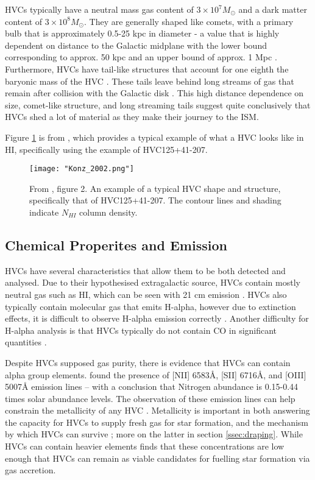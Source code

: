 HVCs typically have a neutral mass gas content of $3\times10^7 M_{\odot}$ and a dark matter content of $3\times10^8 M_{\odot}$. They are generally shaped like comets, with a primary bulb that is approximately 0.5-25 kpc in diameter - a value that is highly dependent on distance to the Galactic midplane with the lower bound corresponding to approx. 50 kpc and an upper bound of approx. 1 Mpc \citep{ID66, ID13}. Furthermore, HVCs have tail-like structures that account for one eighth the baryonic mass of the HVC \citep{ID13}. These tails leave behind long streams of gas that remain after collision with the Galactic disk \citep{ID19}. This high distance dependence on size, comet-like structure, and long streaming tails suggest quite conclusively that HVCs shed a lot of material as they make their journey to the ISM.


Figure \ref{fig:hvc_example} is from \citep{ID13}, which provides a typical example of what a HVC looks like in HI, specifically using the example of HVC125+41-207.

\begin{figure}
    \texttt{[image: "Konz\_2002.png"]}
    \centering
    \caption{From \citep{ID13}, figure 2. An example of a typical HVC shape and structure, specifically that of HVC125+41-207. The contour lines and shading indicate $N_{HI}$ column density.}
    \label{fig:hvc_example}
\end{figure}

\subsection{Chemical Properites and Emission}
\label{ssec:chem}

HVCs have several characteristics that allow them to be both detected and analysed. Due to their hypothesised extragalactic source, HVCs contain mostly neutral gas such as HI, which can be seen with 21 cm emission \citep{ID7, ID8, ID6}. HVCs also typically contain molecular gas that emits H-alpha, however due to extinction effects, it is difficult to observe H-alpha emission correctly \citep{ID9, ID43}. Another difficulty for H-alpha analysis is that HVCs typically do not contain CO in significant quantities \citep{ID66}.


Despite HVCs supposed gas purity, there is evidence that HVCs can contain alpha group elements. \cite{ID49, ID48} found the presence of [NII] 6583{\AA}, [SII] 6716{\AA}, and [OIII] 5007{\AA} emission lines – with a conclusion that Nitrogen abundance is 0.15-0.44 times solar abundance levels. The observation of these emission lines can help constrain the metallicity of any HVC  \citep{ID49}. Metallicity is important in both answering the capacity for HVCs to supply fresh gas for star formation, and the mechanism by which HVCs can survive \citep{ID24}; more on the latter in section \ref{ssec:draping}. While HVCs can contain heavier elements \cite{ID46} finds that these concentrations are low enough that HVCs can remain as viable candidates for fuelling star formation via gas accretion.


